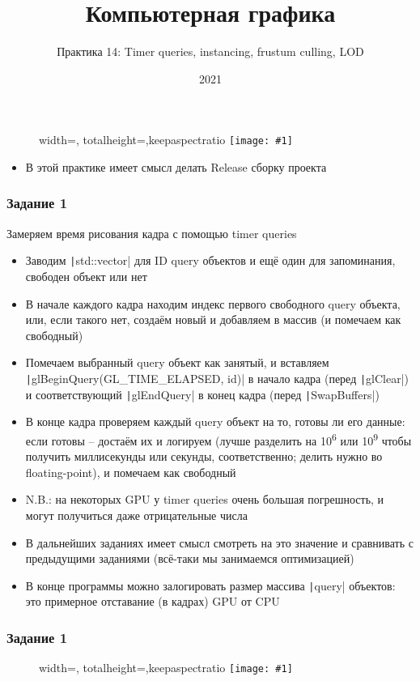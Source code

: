 \documentclass{beamer}
\title{Компьютерная графика}
\subtitle{Практика 14: Timer queries, instancing, frustum culling, LOD}
\date{2021}
\newcommand{\slideimage}[1]{
  \begin{figure}
    \begin{adjustbox}{width=\textwidth, totalheight=\textheight-2\baselineskip-2\baselineskip,keepaspectratio}
      \texttt{[image: \#1]}
    \end{adjustbox}
  \end{figure}
}
\begin{document}
\frame{\titlepage}

\begin{frame}
\slideimage{0.png}
\end{frame}

\begin{frame}[fragile]
\begin{itemize}
\item В этой практике имеет смысл делать Release сборку проекта
\end{itemize}
\end{frame}

\begin{frame}[fragile]
\fontsize{8pt}{8pt}
\frametitle{Задание 1}
Замеряем время рисования кадра с помощью timer queries
\begin{itemize}
\item Заводим \texttt|std::vector| для ID query объектов и ещё один для запоминания, свободен объект или нет
\item В начале каждого кадра находим индекс первого свободного query объекта, или, если такого нет, создаём новый и добавляем в массив (и помечаем как свободный)
\item Помечаем выбранный query объект как занятый, и вставляем \texttt|glBeginQuery(GL_TIME_ELAPSED, id)| в начало кадра (перед \texttt|glClear|) и соответствующий \texttt|glEndQuery| в конец кадра (перед \texttt|SwapBuffers|)
\item В конце кадра проверяем каждый query объект на то, готовы ли его данные: если готовы -- достаём их и логируем (лучше разделить на 10\textsuperscript{6} или 10\textsuperscript{9} чтобы получить миллисекунды или секунды, соответственно; делить нужно во floating-point), и помечаем как свободный
\item N.B.: на некоторых GPU у timer queries очень большая погрешность, и могут получиться даже отрицательные числа
\item В дальнейших заданиях имеет смысл смотреть на это значение и сравнивать с предыдущими заданиями (всё-таки мы занимаемся оптимизацией)
\item В конце программы можно залогировать размер массива \texttt|query| объектов: это примерное отставание (в кадрах) GPU от CPU
\end{itemize}
\end{frame}

\begin{frame}
\frametitle{Задание 1}
\slideimage{0.png}
\end{frame}
\end{document}
